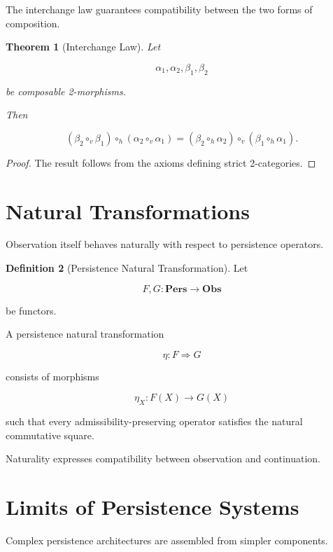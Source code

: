 \documentclass[11pt]{book}
\numberwithin{equation}{chapter}
\theoremstyle{definition}
\newtheorem{definition}{Definition}[chapter]
\theoremstyle{plain}
\newtheorem{theorem}[definition]{Theorem}
\begin{document}
The interchange law guarantees compatibility between the two forms of
composition.

\begin{theorem}[Interchange Law]

Let

\[
\alpha_1,\alpha_2,
\beta_1,\beta_2
\]

be composable 2-morphisms.

Then

\[
(\beta_2\circ_v\beta_1)
\circ_h
(\alpha_2\circ_v\alpha_1)
=
(\beta_2\circ_h\alpha_2)
\circ_v
(\beta_1\circ_h\alpha_1).
\]

\end{theorem}

\begin{proof}

The result follows from the axioms defining strict
2-categories.

\end{proof}

\section{Natural Transformations}

Observation itself behaves naturally with respect to persistence
operators.

\begin{definition}[Persistence Natural Transformation]

Let

\[
F,G:
\mathbf{Pers}
\rightarrow
\mathbf{Obs}
\]

be functors.

A persistence natural transformation

\[
\eta:
F
\Rightarrow
G
\]

consists of morphisms

\[
\eta_X:
F(X)
\rightarrow
G(X)
\]

such that every admissibility-preserving operator satisfies the natural
commutative square.

\end{definition}

Naturality expresses compatibility between observation and
continuation.

\section{Limits of Persistence Systems}

Complex persistence architectures are assembled from simpler
components.
\end{document}

